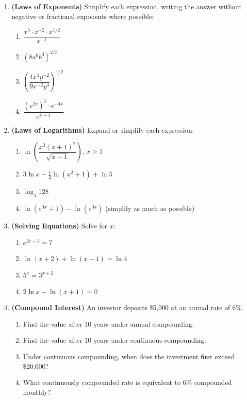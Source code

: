 \documentclass[12pt, a4paper]{article}
\theoremstyle{definition}
\begin{document}
\begin{enumerate}[label=\textbf{A\arabic*.}, leftmargin=2.5em]

\item \textbf{(Laws of Exponents)} Simplify each expression, writing the answer without negative or fractional exponents where possible:
\begin{enumerate}[label=(\alph*)]
  \item $\dfrac{x^3 \cdot x^{-2} \cdot x^{1/2}}{x^{-1}}$
  \item $(8a^6b^3)^{2/3}$
  \item $\left(\dfrac{4x^4y^{-2}}{9x^{-2}y^4}\right)^{1/2}$
  \item $\dfrac{(e^{2x})^3 \cdot e^{-4x}}{e^{x-1}}$
\end{enumerate}

\item \textbf{(Laws of Logarithms)} Expand or simplify each expression:
\begin{enumerate}[label=(\alph*)]
  \item $\ln\!\left(\dfrac{x^3(x+1)^2}{\sqrt{x-1}}\right)$, $x>1$
  \item $3\ln x - \frac{1}{2}\ln(x^2+1) + \ln 5$
  \item $\log_4 128$
  \item $\ln(e^{3x}+1) - \ln(e^{3x})$ \quad (simplify as much as possible)
\end{enumerate}

\item \textbf{(Solving Equations)} Solve for $x$:
\begin{enumerate}[label=(\alph*)]
  \item $e^{2x-3} = 7$
  \item $\ln(x+2) + \ln(x-1) = \ln 4$
  \item $5^x = 3^{x+2}$
  \item $2\ln x - \ln(x+1) = 0$
\end{enumerate}

\item \textbf{(Compound Interest)} An investor deposits \$5{,}000 at an annual rate of 6\%.
\begin{enumerate}[label=(\alph*)]
  \item Find the value after 10 years under annual compounding.
  \item Find the value after 10 years under continuous compounding.
  \item Under continuous compounding, when does the investment first exceed \$20{,}000?
  \item What continuously compounded rate is equivalent to 6\% compounded monthly?
\end{enumerate}

\end{enumerate}
\end{document}
